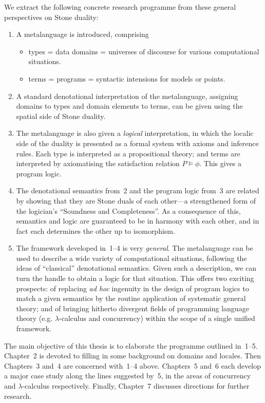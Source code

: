 We extract the following concrete research programme from these general perspectives on Stone duality:
\begin{enumerate}
\item A metalanguage is introduced, comprising
\begin{itemize}
\item types = data domains = universes of discourse for various computational situations.
\item terms = programs = syntactic intensions for models or points.
\end{itemize}
\item A standard denotational interpretation of the metalanguage, assigning domains to types and domain elements to terms, can be given using the spatial side of Stone duality.
\item The metalanguage is also given a {\em logical} interpretation, in which the localic side of the duality is presented as a formal system with axioms and inference rules.
Each type is interpreted as a propositional theory; and terms are interpreted by axiomatising the satisfaction relation $P \models \phi$.
This gives a program logic.
\item The denotational semantics from~2 and the program logic from~3 are related by showing that they are Stone duals of each other---a strengthened form of the logician's ``Soundness and Completeness''.
As a consequence of this, semantics and logic are guaranteed to be in harmony with each other, and in fact each determines the other up to isomorphism.
\item The framework developed in~1--4 is very {\em general}.
The metalanguage can be used to describe a wide variety of computational situations, following the ideas of ``classical'' denotational semantics.
Given such a description, we can turn the handle to obtain a logic for that situation.
This offers two exciting prospects: of replacing {\it ad hoc} ingenuity in the design of program logics to match a given semantics by the routine application of systematic general theory; and of bringing hitherto divergent fields of programming language theory (e.g. $\lambda$-calculus and concurrency) within the scope of a single unified framework.
\end{enumerate}
The main objective of this thesis is to elaborate the programme outlined in~1--5.
Chapter~2 is devoted to filling in some background on domains and locales.
Then Chapters~3 and~4 are concerned with~1--4 above.
Chapters~5 and~6 each develop a major case study along the lines suggested by~5, in the areas of concurrency and $\lambda$-calculus respectively.
Finally, Chapter~7  discusses directions for further research.
